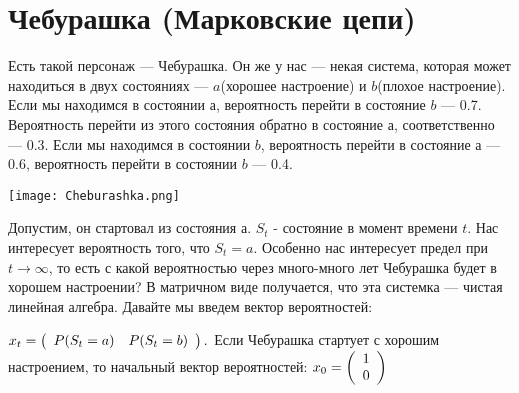 \section {Чебурашка (Марковские цепи)}

Есть такой персонаж --- Чебурашка. Он же у нас --- некая система, которая может находиться в двух состояниях --- $a$(хорошее настроение) и $b$(плохое настроение). Если мы находимся в состоянии $а$, вероятность перейти в состояние $b$ --- 0.7. Вероятность перейти из этого состояния обратно в состояние $а$, соответственно --- 0.3. Если мы находимся в состоянии $b$, вероятность перейти в состояние $а$ --- 0.6, вероятность перейти в состоянии $b$ ---  0.4.

\texttt{[image:  Cheburashka.png]}

Допустим, он стартовал из состояния $а$. $S_t$ - состояние в момент времени $t$. 
Нас интересует вероятность того, что $S_t=a$. 
Особенно нас интересует предел при $t\to \infty$, то есть с какой вероятностью через много-много лет Чебурашка будет в хорошем настроении?
В матричном виде получается, что эта системка --- чистая линейная алгебра. Давайте мы введем вектор вероятностей:

$x_t = \left( \begin{array}{ll}
		P(S_t=a) & P(S_t=b) \\
		\end{array} \right).\\	$
Если Чебурашка стартует с хорошим настроением, то начальный вектор вероятностей:
$x_0= \left( \begin{array}{l}
		1 \\ 
		0\\
		\end{array} \right)\\  $
				
